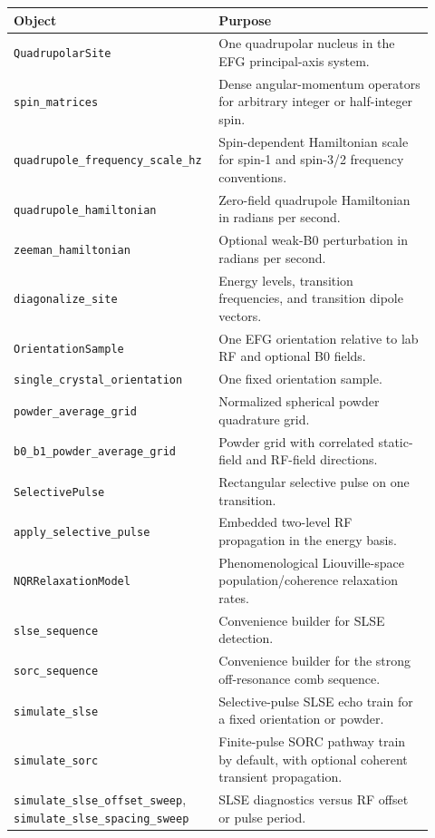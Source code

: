 \documentclass[11pt,oneside]{report}
\newcommand{\code}[1]{\texttt{#1}}
\begin{document}
\begin{longtable}{p{0.42\linewidth}p{0.50\linewidth}}
\toprule
Object & Purpose \\
\midrule
\code{QuadrupolarSite} & One quadrupolar nucleus in the EFG principal-axis system. \\
\code{spin\_matrices} & Dense angular-momentum operators for arbitrary integer or half-integer spin. \\
\code{quadrupole\_frequency\_scale\_hz} & Spin-dependent Hamiltonian scale for spin-1 and spin-3/2 frequency conventions. \\
\code{quadrupole\_hamiltonian} & Zero-field quadrupole Hamiltonian in radians per second. \\
\code{zeeman\_hamiltonian} & Optional weak-B0 perturbation in radians per second. \\
\code{diagonalize\_site} & Energy levels, transition frequencies, and transition dipole vectors. \\
\code{OrientationSample} & One EFG orientation relative to lab RF and optional B0 fields. \\
\code{single\_crystal\_orientation} & One fixed orientation sample. \\
\code{powder\_average\_grid} & Normalized spherical powder quadrature grid. \\
\code{b0\_b1\_powder\_average\_grid} & Powder grid with correlated static-field and RF-field directions. \\
\code{SelectivePulse} & Rectangular selective pulse on one transition. \\
\code{apply\_selective\_pulse} & Embedded two-level RF propagation in the energy basis. \\
\code{NQRRelaxationModel} & Phenomenological Liouville-space population/coherence relaxation rates. \\
\code{slse\_sequence} & Convenience builder for SLSE detection. \\
\code{sorc\_sequence} & Convenience builder for the strong off-resonance comb sequence. \\
\code{simulate\_slse} & Selective-pulse SLSE echo train for a fixed orientation or powder. \\
\code{simulate\_sorc} & Finite-pulse SORC pathway train by default, with optional coherent transient propagation. \\
\code{simulate\_slse\_offset\_sweep}, \code{simulate\_slse\_spacing\_sweep} & SLSE diagnostics versus RF offset or pulse period. \\

\end{longtable}
\end{document}
